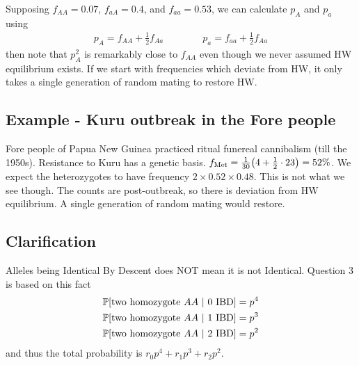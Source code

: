 \documentclass{article}
\newcommand{\prob}{\mathbb{P}}
\begin{document}
            Supposing $f_{AA} = 0.07$, $f_{aA} = 0.4$, and $f_{aa} = 0.53$, we can calculate $p_A$ and $p_a$ using
            \begin{align*}
                p_A = f_{AA} + \frac{1}{2}f_{Aa} \qquad\qquad p_a = f_{aa} + \frac{1}{2}f_{Aa}
            \end{align*}
            then note that $p_A^2$ is remarkably close to $f_{AA}$ even though we never assumed HW equilibrium exists.  If we start with frequencies which deviate from HW, it only takes a single generation of random mating to restore HW.

        \subsection{Example - Kuru outbreak in the Fore people}
            Fore people of Papua New Guinea practiced ritual funereal cannibalism (till the 1950s).  Resistance to Kuru has a genetic basis. $f_{\text{Met}} = \frac{1}{30}\qty(4 + \frac{1}{2}\cdot23) = 52\%$.  We expect the heterozygotes to have frequency $2\times0.52\times0.48$.  This is not what we see though.  The counts are post-outbreak, so there is deviation from HW equilibrium.  A single generation of random mating would restore.

        \subsection{Clarification}
            Alleles being Identical By Descent does NOT mean it is not Identical.  Question 3 is based on this fact
            \begin{align*}
                \prob\qty[\text{two homozygote } AA\ |\ 0 \text{ IBD}] = p^4 \\
                \prob\qty[\text{two homozygote } AA\ |\ 1 \text{ IBD}] = p^3 \\
                \prob\qty[\text{two homozygote } AA\ |\ 2 \text{ IBD}] = p^2
            \end{align*}
            and thus the total probability is $r_0p^4 + r_1p^3 + r_2p^2$.
\end{document}
